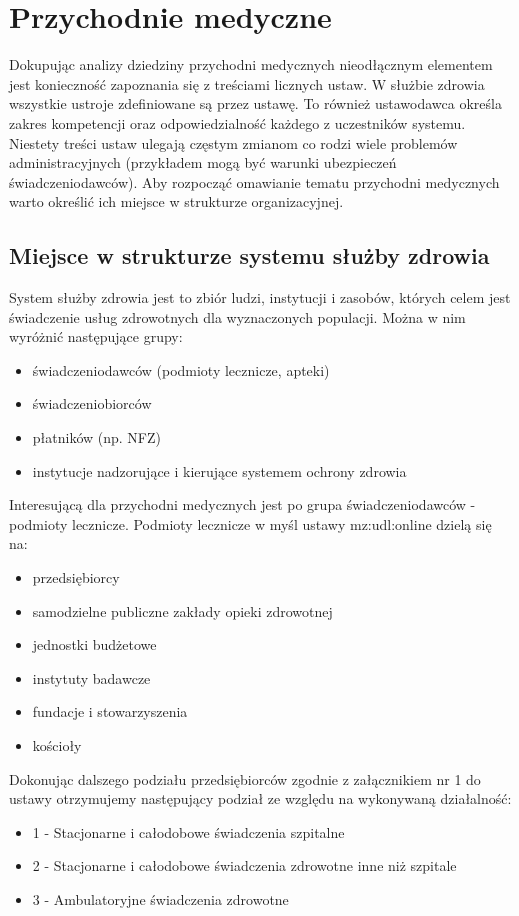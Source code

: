 \chapter{Przychodnie medyczne}
Dokupując analizy dziedziny przychodni medycznych nieodłącznym elementem jest konieczność zapoznania się z treściami licznych ustaw. W służbie zdrowia wszystkie ustroje zdefiniowane są przez ustawę. To również ustawodawca określa zakres kompetencji oraz odpowiedzialność każdego z uczestników systemu. Niestety treści ustaw ulegają częstym zmianom co rodzi wiele problemów administracyjnych (przykładem mogą być warunki ubezpieczeń świadczeniodawców). Aby rozpocząć omawianie tematu przychodni medycznych warto określić ich miejsce w strukturze organizacyjnej.

\section[Miejsce w strukturze systemu służby zdrowia][Miejsce w strukturze systemu służby zdrowia]{Miejsce w strukturze systemu służby zdrowia}
System służby zdrowia jest to zbiór ludzi, instytucji i zasobów, których celem jest świadczenie usług zdrowotnych dla wyznaczonych populacji.
Można w nim wyróżnić następujące grupy:
\begin{itemize}
\item świadczeniodawców (podmioty lecznicze, apteki)
\item świadczeniobiorców
\item płatników (np. NFZ)
\item instytucje nadzorujące i kierujące systemem ochrony zdrowia
\end{itemize}

Interesującą dla przychodni medycznych jest po grupa świadczeniodawców - podmioty lecznicze. Podmioty lecznicze w myśl ustawy {mz:udl:online} dzielą się na:
\begin{itemize}
\item przedsiębiorcy 
\item samodzielne publiczne zakłady opieki zdrowotnej
\item jednostki budżetowe
\item instytuty badawcze
\item fundacje i stowarzyszenia
\item kościoły
\end{itemize} 
Dokonując dalszego podziału przedsiębiorców zgodnie z załącznikiem nr 1 do ustawy otrzymujemy następujący podział ze względu na wykonywaną działalność:
\begin{itemize}
\item 1 - Stacjonarne i całodobowe świadczenia szpitalne
\item 2 - Stacjonarne i całodobowe świadczenia zdrowotne inne niż szpitale
\item 3 - Ambulatoryjne świadczenia zdrowotne
\end{itemize}

